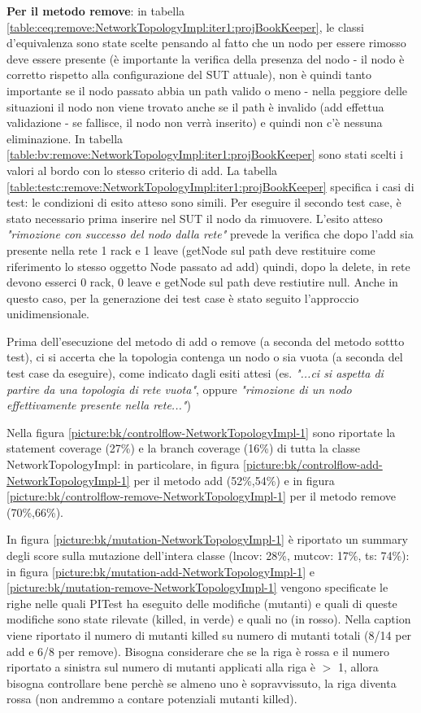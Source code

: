 \documentclass[10pt, a4paper]{article}
\newcommand{\gettablelabel}[5]{table:#1:#2:#3:iter#4:proj#5}
\newcommand{\getpicturelabel}[1]{picture:#1}
\def\bookkeeper{BookKeeper}
\begin{document}
	\textbf{Per il metodo remove}: in tabella \ref{\gettablelabel{ceq}{remove}{NetworkTopologyImpl}{1}
	{\bookkeeper}}, le classi d'equivalenza sono state scelte pensando al fatto che un nodo per essere
	rimosso deve essere presente (è importante la verifica della presenza del nodo - il nodo è corretto rispetto
	alla configurazione del SUT attuale), non è quindi tanto 
	importante se il nodo passato abbia un path valido
	o meno - nella peggiore delle situazioni il nodo non viene trovato anche se il path è invalido (add 
	effettua validazione - se fallisce, il nodo non verrà inserito) e quindi non c'è nessuna 
	eliminazione.
	In tabella \ref{\gettablelabel{bv}{remove}{NetworkTopologyImpl}{1}{\bookkeeper}} sono stati scelti i valori al
	bordo con lo stesso criterio di add.
	La tabella \ref{\gettablelabel{testc}{remove}{NetworkTopologyImpl}{1}{\bookkeeper}} specifica i casi di test:
	le condizioni di esito atteso sono simili. Per eseguire il secondo test case, è stato necessario
	prima inserire nel SUT il nodo da rimuovere. L'esito atteso \textit{"rimozione con successo
	del nodo dalla rete"} prevede la verifica che dopo l'add sia presente nella rete 1 rack e 1 leave 
	(getNode sul path deve restituire come riferimento lo stesso oggetto Node passato ad add)
	quindi, dopo la delete, in rete devono esserci 0 rack, 0 leave e getNode sul path deve restiutire 
	null. Anche in questo caso, per la
	generazione dei test case è stato seguito l'approccio unidimensionale.
	
	Prima dell'esecuzione del metodo di add o remove (a seconda del metodo sottto test), ci si accerta 	
	che la topologia contenga un nodo o sia vuota (a seconda del test case da eseguire), come indicato
	dagli esiti attesi (es. \textit{"...ci si aspetta di partire da una topologia di rete vuota"}, 
	oppure \textit{"rimozione di un nodo effettivamente presente nella rete..."})
		
	Nella figura \ref{\getpicturelabel{bk/controlflow-NetworkTopologyImpl-1}} sono riportate la
	statement coverage (27\%) e la branch coverage (16\%) di tutta la classe NetworkTopologyImpl: in particolare,
	in figura \ref{\getpicturelabel{bk/controlflow-add-NetworkTopologyImpl-1}} per il metodo add (52\%,54\%) e in
	figura \ref{\getpicturelabel{bk/controlflow-remove-NetworkTopologyImpl-1}} per il metodo remove (70\%,66\%).
	
	In figura \ref{\getpicturelabel{bk/mutation-NetworkTopologyImpl-1}} è riportato un summary degli
	score sulla mutazione dell'intera classe (lncov: 28\%, mutcov: 17\%, ts: 74\%): in figura \ref{\getpicturelabel{bk/mutation-add-NetworkTopologyImpl-1}} 
	e \ref{\getpicturelabel{bk/mutation-remove-NetworkTopologyImpl-1}} vengono
	specificate le righe nelle quali PITest ha eseguito delle modifiche (mutanti) e quali di queste 
	modifiche sono state rilevate (killed, in verde) e quali no (in rosso). Nella caption viene 
	riportato
	il numero di mutanti killed su numero di mutanti totali (8/14 per add e 6/8 per remove). 
	Bisogna considerare che se la riga è rossa
	e il numero riportato a sinistra sul numero di mutanti applicati alla riga è $>$ 1, allora bisogna
	controllare bene perchè se almeno uno è sopravvissuto, la riga diventa rossa (non andremmo a contare
	potenziali mutanti killed).
	
\end{document}
